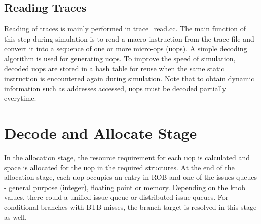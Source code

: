 


\subsection{Reading Traces} 

Reading of traces is mainly performed in trace\_read.cc. The main function of
this step during simulation is to read a macro instruction from the trace file
and convert it into a sequence of one or more micro-ops (uops). A simple
decoding algorithm is used for generating uops. To improve the speed of
simulation, decoded uops are stored in a hash table for reuse when the same
static instruction is encountered again during simulation. Note that to obtain
dynamic information such as addresses accessed, uops must be decoded partially
everytime.



\section{Decode and  Allocate Stage}



In the allocation stage, the resource requirement for each uop is calculated
and space is allocated for the uop in the required structures. At the end of the
allocation stage, each uop occupies an entry in ROB and one of the issues
queues - general purpose (integer), floating point or memory. Depending on the
knob values, there could a unified issue queue or distributed issue queues. For
conditional branches with BTB misses, the branch target is resolved in this
stage as well.


